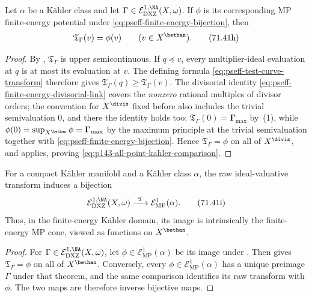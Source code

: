 \begin{corollary}\label{cor:p143-all-point-kahler-comparison}
Let \(\alpha\) be a K\"ahler class and let
\(\Gamma\in\mathcal E^{1,\NA}_{\mathrm{DXZ}}(X,\omega)\).  If \(\phi\)
is its corresponding MP finite-energy potential under
\eqref{eq:pseff-finite-energy-bijection}, then
\[
 \mathfrak T_\Gamma(v)=\phi(v)
 \qquad(v\in X^{\bethan}).
\tag{71.41h}\label{eq:p143-all-point-kahler-comparison}
\]
\end{corollary}

\begin{proof}
By , \(\mathfrak T_\Gamma\) is upper
semicontinuous.  If \(q\preceq v\), every multiplier-ideal evaluation at
\(q\) is at most its evaluation at \(v\).  The defining formula
\eqref{eq:pseff-test-curve-transform} therefore gives
\(\mathfrak T_\Gamma(q)\geq\mathfrak T_\Gamma(v)\).  The divisorial
identity \eqref{eq:pseff-finite-energy-divisorial-link} covers the
\emph{nonzero} rational multiples of divisor orders; the convention for
\(X^{\divis}\) fixed before
 also includes the trivial
semivaluation \(0\), and there the identity holds too:
\(\mathfrak T_\Gamma(0)=\boldsymbol\Gamma_{\max}\) by
\,(1), while
\(\phi(0)=\sup_{X^{\bethan}}\phi=\boldsymbol\Gamma_{\max}\) by the maximum principle
at the trivial semivaluation together with \eqref{eq:pseff-finite-energy-bijection}.
Hence \(\mathfrak T_\Gamma=\phi\) on all of \(X^{\divis}\), and
 applies, proving
\eqref{eq:p143-all-point-kahler-comparison}.
\end{proof}

\begin{corollary}\label{cor:p141-finite-energy-raw-image}
For a compact K\"ahler manifold and a K\"ahler class \(\alpha\), the
raw ideal-valuative transform induces a bijection
\[
 \mathcal E^{1,\NA}_{\mathrm{DXZ}}(X,\omega)
 \xrightarrow{\ \mathfrak T\ }
 \mathcal E^1_{\mathrm{MP}}(\alpha).
\tag{71.41i}\label{eq:p141-finite-energy-raw-image}
\]
Thus, in the finite-energy K\"ahler domain, its image is intrinsically
the finite-energy MP cone, viewed as functions on \(X^{\bethan}\).
\end{corollary}

\begin{proof}
For \(\Gamma\in\mathcal E^{1,\NA}_{\mathrm{DXZ}}(X,\omega)\), let
\(\phi\in\mathcal E^1_{\mathrm{MP}}(\alpha)\) be its image under
.  Then
 gives
\(\mathfrak T_\Gamma=\phi\) on all of \(X^{\bethan}\).  Conversely,
every \(\phi\in\mathcal E^1_{\mathrm{MP}}(\alpha)\) has a unique
preimage \(\Gamma\) under that theorem, and the same comparison identifies
its raw transform with \(\phi\).  The two maps are therefore inverse
bijective maps.
\end{proof}

